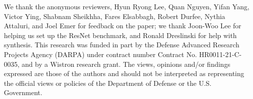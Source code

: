 We thank the anonymous reviewers, Hyun Ryong Lee, Quan Nguyen, Yifan Yang,
Victor Ying, Shabnam Sheikhha, Fares Elsabbagh, Robert Durfee, Nythia Attaluri,
and Joel Emer for feedback on the paper; we thank Joon-Woo Lee for helping us
set up the ResNet benchmark, and Ronald Dreslinski for help with synthesis.
This research was funded in part by the Defense Advanced Research Projects
Agency (DARPA) under contract number Contract No. HR0011-21-C-0035, and by a
Wistron research grant. The views, opinions and/or findings expressed are those
of the authors and should not be interpreted as representing the official views
or policies of the Department of Defense or the U.S. Government.

